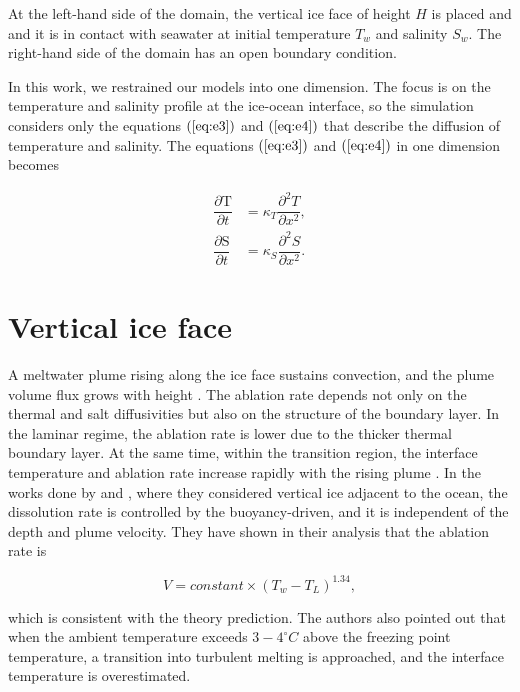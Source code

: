 \documentclass[11pt,a4paper]{article}
\begin{document}
	At the left-hand side of the domain, the vertical ice face of height $H$ is placed and and it is in contact with seawater at initial temperature $T_w$ and salinity $S_w$. The right-hand side of the domain has an open boundary condition.
	
	In this work, we restrained our models into one dimension. The focus is on the temperature and salinity profile at the ice-ocean interface, so the simulation considers only the equations $(\ref{eq:e3})$ and $(\ref{eq:e4})$ that describe the diffusion of temperature and salinity. The equations $(\ref{eq:e3})$ and $(\ref{eq:e4})$ in one dimension becomes
	
	\begin{eqnarray}
		\label{eq:6}
		\dfrac{\partial\mathrm{T}}{\partial t} & = \kappa_T\dfrac{\partial^2T}{\partial x^2} ,\\[0.3cm] 
		\label{eq:7}
		\dfrac{\partial\mathrm{S}}{\partial t} & = \kappa_S\dfrac{\partial^2S}{\partial x^2} . 
	\end{eqnarray}
	
	
	\section{Vertical ice face}
	
	A meltwater plume rising along the ice face sustains convection, and the plume volume flux grows with height \citep{jenkins2011convection}. The ablation rate depends not only on the thermal and salt diffusivities but also on the structure of the boundary layer. In the laminar regime, the ablation rate is lower due to the thicker thermal boundary layer. At the same time, within the transition region, the interface temperature and ablation rate increase rapidly with the rising plume \citep{gayen2016simulation}. In the works done by \cite{kerr2015dissolution} and \cite{gayen2016simulation}, where they considered vertical ice adjacent to the ocean, the dissolution rate is controlled by the buoyancy-driven, and it is independent of the depth and plume velocity. They have shown in their analysis that the ablation rate is 
	
	\begin{equation}
	    V = constant\times (T_w-T_L)^{1.34},
	\end{equation}
	
	which is consistent with the theory prediction. The authors also pointed out that when the ambient temperature exceeds $3-4^{\circ} C$ above the freezing point temperature, a transition into turbulent melting is approached, and the interface temperature is overestimated.
	
\end{document}
